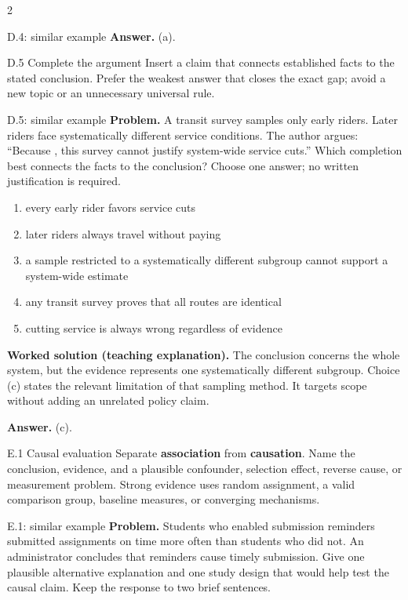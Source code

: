 \documentclass[10pt]{extarticle}
\newcommand{\term}[1]{\textbf{\color{ArgNavy}#1}}
\begin{document}
\begin{multicols}{2}
\begin{workedbox}{D.4: similar example}
\textbf{Answer.} (a).
\end{workedbox}

\begin{methodbox}{D.5 Complete the argument}
Insert a claim that connects established facts to the stated conclusion. Prefer
the weakest answer that closes the exact gap; avoid a new topic or an unnecessary
universal rule.
\end{methodbox}
\begin{workedbox}{D.5: similar example}
\textbf{Problem.} A transit survey samples only early riders. Later riders face systematically different service conditions. The author argues: ``Because \underline{\hspace{0.7in}}, this survey cannot justify system-wide service cuts.'' Which completion best connects the facts to the conclusion? Choose one answer; no written justification is required.

\begin{enumerate}[label=(\alph*)]
\item every early rider favors service cuts
\item later riders always travel without paying
\item a sample restricted to a systematically different subgroup cannot support a system-wide estimate
\item any transit survey proves that all routes are identical
\item cutting service is always wrong regardless of evidence
\end{enumerate}
\textbf{Worked solution (teaching explanation).} The conclusion concerns the whole system, but the evidence represents one systematically different subgroup. Choice (c) states the relevant limitation of that sampling method. It targets scope without adding an unrelated policy claim.

\textbf{Answer.} (c).
\end{workedbox}


\begin{methodbox}{E.1 Causal evaluation}
Separate \term{association} from \term{causation}. Name the conclusion, evidence,
and a plausible confounder, selection effect, reverse cause, or measurement
problem. Strong evidence uses random assignment, a valid comparison group,
baseline measures, or converging mechanisms.
\end{methodbox}
\begin{workedbox}{E.1: similar example}
\textbf{Problem.} Students who enabled submission reminders submitted assignments on time more often than students who did not. An administrator concludes that reminders cause timely submission. Give one plausible alternative explanation and one study design that would help test the causal claim. Keep the response to two brief sentences.


\end{workedbox}
\end{multicols}
\end{document}
